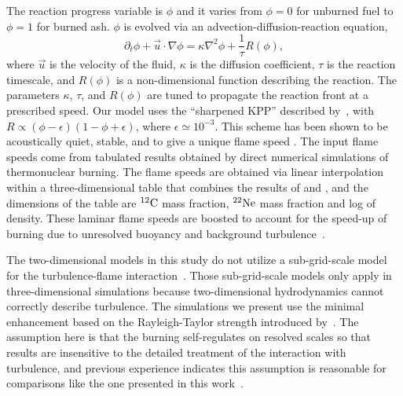 \documentclass[preprint2]{aastex63}
\newcommand{\C}[1]{\ensuremath{{}^{#1}{\rm C}}}
\newcommand{\Ne}[1]{\ensuremath{{}^{#1}{\rm Ne}}}
\newcommand{\pv}{\ensuremath{\phi}}
\begin{document}
The reaction progress variable is $\phi$ and it varies from $\phi=0$ for
unburned fuel to $\phi=1$ for burned ash. $\phi$ is evolved
via an advection-diffusion-reaction equation,
\begin{equation}
  \label{eq:ard}
  \partial_t \pv + \vec{u}\cdot\nabla \pv = \kappa \nabla^2 \pv +
\frac{1}{\tau} R\left(\phi\right) ,
\end{equation}
where $\vec{u}$ is the velocity of the fluid, $\kappa$ is the
diffusion coefficient, $\tau$ is the reaction timescale, and $R(\phi)$ is
a non-dimensional function describing the reaction. The parameters
$\kappa$, $\tau$, and $R(\phi)$ are tuned to propagate the reaction
front at a prescribed speed.  Our model uses the ``sharpened KPP''
 described by~\cite{VladWeirRyzh06},
with $R\propto(\phi-\epsilon)(1-\phi+\epsilon)$, where
$\epsilon \simeq 10^{-3}$.  This scheme has been shown to be
acoustically quiet, stable, and to give a unique flame speed
\citep{townsley.calder.ea:flame}. The input flame speeds come from
tabulated results obtained by direct numerical simulations of
thermonuclear burning.
{\color{blue}
The flame speeds are obtained via linear interpolation within a 
three-dimensional table that combines the results of \citet{timmes92} 
and \citet{Chametal08}, and the dimensions of the table are \C{12} 
mass fraction, \Ne{22} mass fraction and log of density.}
These laminar flame speeds are boosted to account for the speed-up 
of burning due to unresolved buoyancy and background turbulence~\citep{Khok95,
gamezo.khokhlov.ea:thermonuclear,townsley.calder.ea:flame,jacketal2014}.

The two-dimensional models in this study do not utilize a sub-grid-scale
model for the turbulence-flame
interaction~\citep[See][for examples]{Schmetal06a,Schmetal06b,jacketal2014}.
Those sub-grid-scale models only apply in three-dimensional
simulations because two-dimensional hydrodynamics cannot
correctly describe turbulence. The simulations we present
use the minimal enhancement based on the Rayleigh-Taylor
strength introduced by~\citet{townsley.calder.ea:flame}. The
assumption here is that the burning self-regulates on resolved
scales so that results are insensitive to the detailed treatment
of the interaction with turbulence, and previous experience
indicates this assumption is reasonable for comparisons
like the one presented in this work~\citep{townsley.calder.ea:flame,
willcoxetal2016}.
\end{document}
